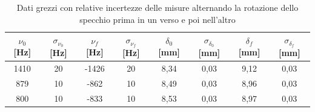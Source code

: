 \documentclass{article}
\begin{document}
            \begin{table}[H]

                \centering
                \begin{tabular}{c c c c c c c c} 

                    \toprule
                    $\nu_0$ [Hz] & $\sigma_{\nu_0}$ [Hz] & $\nu_f$ [Hz] &  $\sigma_{\nu_f}$ [Hz] & 
                    $\delta_0$ [mm] & $\sigma_{\delta_0}$ [mm] & $\delta_f$ [mm] & $\sigma_{\delta_f}$ [mm] \\ 
                    
                    \midrule
                    1410 & 20 & -1426 & 20 & 8,34 & 0,03 & 9,12 & 0,03  \\ 
                    879 & 10 & -862 & 10 & 8,49 & 0,03 & 8,96 & 0,03  \\ 
                    800 & 10 & -833 & 10 & 8,53 & 0,03 & 8,97 & 0,03  \\ 
                    \bottomrule           
                
                \end{tabular}

                \caption{Dati grezzi con relative incertezze delle misure alternando la rotazione dello specchio prima in un verso e poi nell'altro}

            \end{table}
\end{document}
